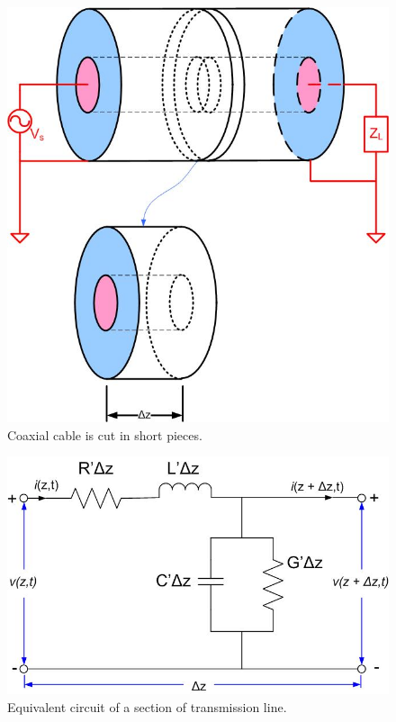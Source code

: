 \documentclass{ximera}
\begin{document}
\begin{figure}[htbp]
\begin{center}
\includegraphics[scale=0.3]{../jpg/Coaxtl.jpg}
\caption{Coaxial cable is cut in short pieces.}
\label{lineeqcPieces}
\end{center}
\end{figure}

\begin{figure}[htbp]
\begin{center}
\includegraphics[scale=0.3]{../jpg/Equivalent_Circuit_of_Transmission_Line.jpg}
\caption{Equivalent circuit of a section of transmission line.}
\label{lineeqcOnePiece}
\end{center}
\end{figure}
\end{document}
